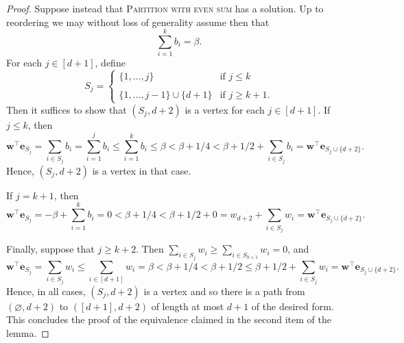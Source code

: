 \documentclass[10pt,a4paper]{amsart}
\renewcommand{\emptyset}{\varnothing}
\begin{document}
\begin{proof}
Suppose instead that \textsc{Partition with even sum} has a solution. Up to reordering we may without loss of generality assume then that
\[\sum_{i=1}^{k} b_{i} = \beta.\]
For each $j\in [d+1]$, define 
\[S_{j} =\begin{cases}
    \{1, \dots,j\} &\text{if } j \leq k \\ \\
    \{1,\dots, j-1\} \cup \{d+1\} &\text{if } j\ge k+1. 
\end{cases}\]
Then it suffices to show that $(S_{j}, d+2)$ is a vertex for each $j \in [d+1]$. If $j \leq k$, then 
\[\mathbf{w}^{\intercal} \mathbf{e}_{S_{j}} = \sum_{i \in S_{j}} b_{i} = \sum_{i=1}^{j} b_{i} \leq \sum_{i=1}^{k} b_{i} \leq \beta < \beta + 1/4 < \beta + 1/2 + \sum_{i\in S_{j}} b_{i} = \mathbf{w}^{\intercal} \mathbf{e}_{S_{j} \cup \{d+2\}}.\]
Hence, $(S_{j}, d+2)$ is a vertex in that case. 

If $j = k+1$, then
\[\mathbf{w}^{\intercal} \mathbf{e}_{S_{j}} = -\beta + \sum_{i=1}^{k} b_{i} = 0 < \beta + 1/4 < \beta + 1/2 + 0 = w_{d+2} + \sum_{i \in S_{j}} w_{i} = \mathbf{w}^{\intercal} \mathbf{e}_{S_{j} \cup \{d+2\}}.\]

Finally, suppose that $j \geq k+2$. Then $\sum_{i \in S_{j}} w_{i} \geq \sum_{i\in S_{k+1}}w_i=0$, and
\[\mathbf{w}^{\intercal}\mathbf{e}_{S_{j}} = \sum_{i \in S_{j}} w_{i} \leq \sum_{i \in [d+1]} w_{i} = \beta < \beta + 1/4 < \beta + 1/2 \leq \beta + 1/2 + \sum_{i \in S_{j}} w_{i} = \mathbf{w}^{\intercal} \mathbf{e}_{S_{j} \cup \{d+2\}}.\]
Hence, in all cases, $(S_{j}, d+2)$ is a vertex and so there is a path from $(\emptyset, d+2)$ to $([d+1], d+2)$ of length at most $d+1$ of the desired form. This concludes the proof of the equivalence claimed in the second item of the lemma. 
\end{proof}
\end{document}
